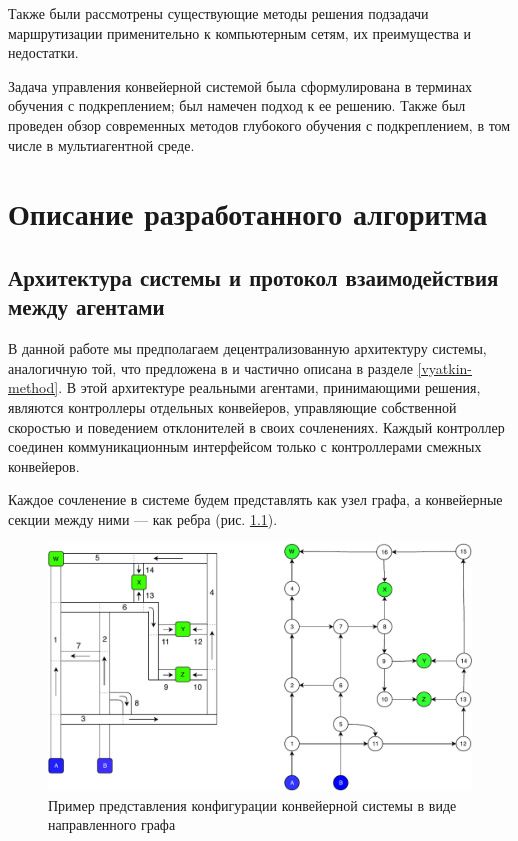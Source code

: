 \documentclass[specification,annotation,times]{itmo-student-thesis}
\theoremstyle{definition}
\begin{document}
Также были рассмотрены существующие методы решения подзадачи маршрутизации
применительно к компьютерным сетям, их преимущества и недостатки.

Задача управления конвейерной системой была сформулирована в терминах обучения с
подкреплением; был намечен подход к ее решению. Также был проведен обзор
современных методов глубокого обучения с подкреплением, в том числе в
мультиагентной среде.

\finishrelatedwork

\chapter{Описание разработанного алгоритма}\label{chapter-algorithm}

\section{Архитектура системы и протокол взаимодействия между агентами}\label{system-arch}

В данной работе мы предполагаем децентрализованную архитектуру системы,
аналогичную той, что предложена в \cite{black2009intelligent,
  vyatkin-controllers} и частично описана в разделе \ref{vyatkin-method}. В
этой архитектуре реальными агентами, принимающими решения, являются контроллеры
отдельных конвейеров, управляющие собственной скоростью и поведением
отклонителей в своих сочленениях. Каждый контроллер соединен коммуникационным
интерфейсом только с контроллерами смежных конвейеров.

Каждое сочленение в системе будем представлять как узел графа, а конвейерные
секции между ними --- как ребра (рис. \ref{conveyor-graph-representation}).

\begin{figure}[!h]
  \caption{Пример представления конфигурации конвейерной системы в виде
    направленного графа}\label{conveyor-graph-representation}
  \centering
  \includegraphics[width=\textwidth]{conveyor-1-illustration-2}
\end{figure}
\end{document}
